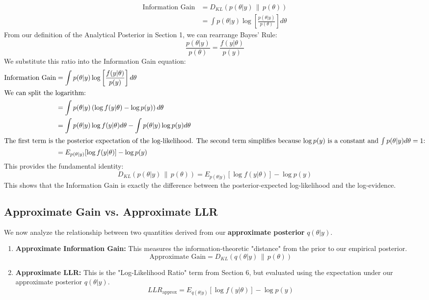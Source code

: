 \documentclass{article}
\theoremstyle{definition}
\begin{document}
\begin{align}
\text{Information Gain} &= D_{KL}(p(\theta|y) \,\|\, p(\theta)) \\
&= \int p(\theta|y) \log\left[ \frac{p(\theta|y)}{p(\theta)} \right] d\theta
\end{align}
From our definition of the Analytical Posterior in Section 1, we can rearrange Bayes' Rule:
\begin{equation}
\frac{p(\theta|y)}{p(\theta)} = \frac{f(y|\theta)}{p(y)}
\end{equation}
We substitute this ratio into the Information Gain equation:
\begin{align}
\text{Information Gain} &= \int p(\theta|y) \log\left[ \frac{f(y|\theta)}{p(y)} \right] d\theta \\
\intertext{We can split the logarithm:}
&= \int p(\theta|y) \left( \log f(y|\theta) - \log p(y) \right) d\theta \\
&= \int p(\theta|y) \log f(y|\theta) d\theta - \int p(\theta|y) \log p(y) d\theta \\
\intertext{The first term is the posterior expectation of the log-likelihood. The second term simplifies because $\log p(y)$ is a constant and $\int p(\theta|y) d\theta = 1$:}
&= E_{p(\theta|y)}[\log f(y|\theta)] - \log p(y)
\end{align}
This provides the fundamental identity:
\begin{equation}
D_{KL}(p(\theta|y) \,\|\, p(\theta)) = E_{p(\theta|y)}[\log f(y|\theta)] - \log p(y)
\end{equation}
This shows that the Information Gain is exactly the difference between the posterior-expected log-likelihood and the log-evidence.

\subsection{Approximate Gain vs. Approximate LLR}

We now analyze the relationship between two quantities derived from our \textbf{approximate posterior} $q(\theta|y)$.

\begin{enumerate}
    \item \textbf{Approximate Information Gain:} This measures the information-theoretic "distance" from the prior to our empirical posterior.
    \begin{equation}
        \text{Approximate Gain} = D_{KL}(q(\theta|y) \,\|\, p(\theta))
    \end{equation}
    
    \item \textbf{Approximate LLR:} This is the "Log-Likelihood Ratio" term from Section 6, but evaluated using the expectation under our approximate posterior $q(\theta|y)$.
    \begin{equation}
        LLR_{\text{approx}} = E_{q(\theta|y)}[\log f(y|\theta)] - \log p(y)
    \end{equation}
\end{enumerate}
\end{document}

